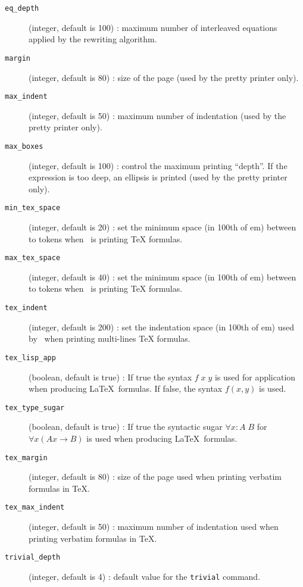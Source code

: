 \begin{description}
  \item [\tt eq\_depth] (integer, default is 100) : maximum number of
    interleaved equations applied by the rewriting algorithm.

  \item [\tt margin] (integer, default is 80) : size of the page (used by the
    pretty printer only).

  \item [\tt max\_indent] (integer, default is 50) : maximum number of
    indentation (used by the pretty printer only).

  \item [\tt max\_boxes] (integer, default is 100) : control the maximum
    printing ``depth''. If the expression is too deep, an ellipsis is printed
    (used by the pretty printer only).

  \item [\tt min\_tex\_space] (integer, default is 20) : set the minimum space
    (in 100th of em) between to tokens when \AFD\ is printing TeX formulas.

  \item [\tt max\_tex\_space] (integer, default is 40) : set the minimum space
    (in 100th of em) between to tokens when \AFD\ is printing TeX formulas.

  \item [\tt tex\_indent] (integer, default is 200) : set the indentation space
    (in 100th of em) used by \AFD\ when printing multi-lines TeX formulas.

  \item [\tt tex\_lisp\_app] (boolean, default is true) : If true the syntax
     $f\;x\;y$ is used for application when producing \LaTeX\ formulas. If
     false, the syntax $f(x,y)$ is used.

  \item [\tt tex\_type\_sugar] (boolean, default is true) : If true the
    syntactic sugar $\forall x:A\;B$ for $\forall x (A x \to B)$ is
    used  when producing \LaTeX\ formulas.

  \item [\tt tex\_margin] (integer, default is 80) : size of the page used
    when printing verbatim formulas in TeX.

  \item [\tt tex\_max\_indent] (integer, default is 50) : maximum number of
    indentation used when printing verbatim formulas in TeX.

  \item [\tt trivial\_depth] (integer, default is 4) : default value for the
    {\tt trivial} command.

\end{description}


